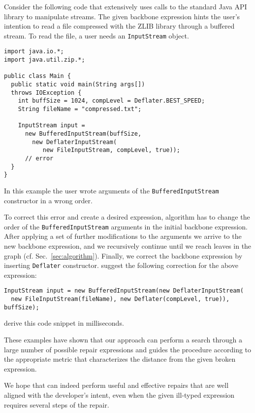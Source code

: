 Consider the following code that extensively uses
calls to the standard Java API library to manipulate streams.
The given backbone expression hints the user's intention to read a file 
compressed with the ZLIB library through a buffered stream.
To read the file, a user needs an \lstinline{InputStream} object.
\begin{lstlisting}
import java.io.*;
import java.util.zip.*;

public class Main {
  public static void main(String args[]) 
  throws IOException {
    int buffSize = 1024, compLevel = Deflater.BEST_SPEED;
    String fileName = "compressed.txt";
    
    InputStream input = 
      new BufferedInputStream(buffSize,
        new DeflaterInputStream(
           new FileInputStream, compLevel, true)); 
      // error
  }
}
\end{lstlisting}

In this example the user wrote arguments of 
the \lstinline{BufferedInputStream} constructor in a wrong order.

To correct this error and create a desired expression, 
\ourTool algorithm has to change the order of
the \lstinline{BufferedInputStream} arguments in the initial backbone expression.
After applying a set of further modifications to the arguments we arrive to 
the new backbone expression, and we recursively continue until we reach leaves in the
\ourTool graph (cf. Sec.~\ref{sec:algorithm}). Finally, we correct the backbone expression
by inserting \lstinline{Deflater} constructor. \ourTool suggest the following correction for the above expression:
\begin{lstlisting}    
InputStream input = new BufferedInputStream(new DeflaterInputStream(
  new FileInputStream(fileName), new Deflater(compLevel, true)), buffSize);
\end{lstlisting}
\ourTool derive this code snippet in  milliseconds. 

These examples have shown that our approach can perform a search through a large number of
possible repair expressions and guides the procedure according to the appropriate metric
that characterizes the distance from the given broken expression.

We hope that \ourTool can indeed perform useful
and effective repairs that are well aligned with the developer's intent, even when
 the given ill-typed expression requires several steps of the repair.  






